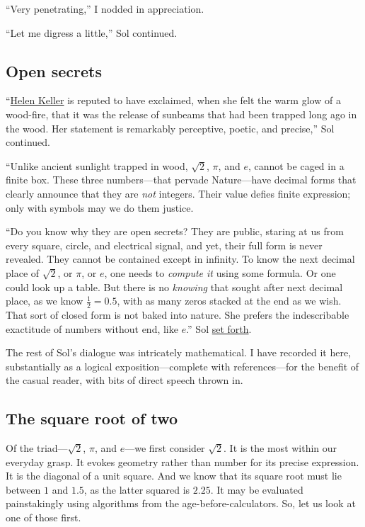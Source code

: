 \documentclass[
  a4paper,
]{article}
\begin{document}
``Very penetrating,'' I nodded in appreciation.

``Let me digress a little,'' Sol continued.

\subsection{Open secrets}\label{open-secrets}

``\href{https://en.wikipedia.org/wiki/Helen_Keller}{Helen Keller} is
reputed to have exclaimed, when she felt the warm glow of a wood-fire,
that it was the release of sunbeams that had been trapped long ago in
the wood. Her statement is remarkably perceptive, poetic, and precise,''
Sol continued.

``Unlike ancient sunlight trapped in wood, \(\sqrt{2}\), \(\pi\), and
\(e\), cannot be caged in a finite box. These three numbers---that
pervade Nature---have decimal forms that clearly announce that they are
\emph{not} integers. Their value defies finite expression; only with
symbols may we do them justice.

``Do you know why they are open secrets? They are public, staring at us
from every square, circle, and electrical signal, and yet, their full
form is never revealed. They cannot be contained except in infinity. To
know the next decimal place of \(\sqrt{2}\), or \(\pi\), or \(e\), one
needs to \emph{compute it} using some formula. Or one could look up a
table. But there is no \emph{knowing} that sought after next decimal
place, as we know \(\frac{1}{2} = 0.5\), with as many zeros stacked at
the end as we wish. That sort of closed form is not baked into nature.
She prefers the indescribable exactitude of numbers without end, like
\(e\).'' Sol \href{https://www.thefreedictionary.com/set+forth}{set
forth}.

The rest of Sol's dialogue was intricately mathematical. I have recorded
it here, substantially as a logical exposition---complete with
references---for the benefit of the casual reader, with bits of direct
speech thrown in.

\subsection{The square root of two}\label{the-square-root-of-two}

Of the triad---\(\sqrt{2}\), \(\pi\), and \(e\)---we first consider
\(\sqrt{2}\). It is the most within our everyday grasp. It evokes
geometry rather than number for its precise expression. It is the
diagonal of a unit square. And we know that its square root must lie
between \(1\) and \(1.5\), as the latter squared is \(2.25\). It may be
evaluated painstakingly using algorithms from the
age-before-calculators. So, let us look at one of those first.
\end{document}
